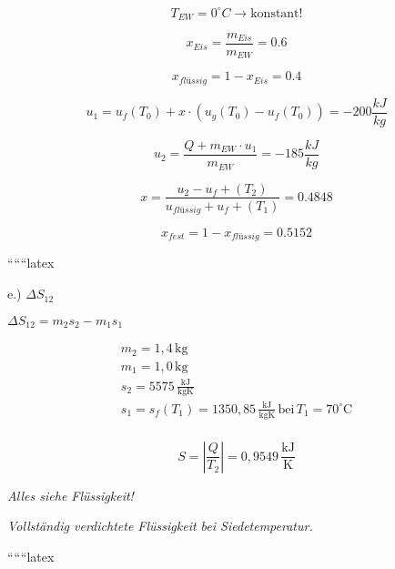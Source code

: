 \[
T_{EW} = 0^\circ C \rightarrow \text{konstant!}
\]

\[
x_{Eis} = \frac{m_{Eis}}{m_{EW}} = 0.6
\]

\[
x_{flüssig} = 1 - x_{Eis} = 0.4
\]

\[
u_1 = u_f(T_0) + x \cdot (u_g(T_0) - u_f(T_0)) = -200 \frac{kJ}{kg}
\]

\[
u_2 = \frac{Q + m_{EW} \cdot u_1}{m_{EW}} = -185 \frac{kJ}{kg}
\]

\[
x = \frac{u_2 - u_f + (T_2)}{u_{flüssig} + u_f + (T_1)} = 0.4848
\]

\[
x_{fest} = 1 - x_{flüssig} = 0.5152
\]

``````latex


e.) \(\Delta S_{12}\)

\(\Delta S_{12} = m_2 s_2 - m_1 s_1\)

\[
\begin{array}{c}
m_2 = 1,4 \, \text{kg} \\
m_1 = 1,0 \, \text{kg} \\
s_2 = 5575 \, \frac{\text{kJ}}{\text{kgK}} \\
s_1 = s_f(T_1) = 1350,85 \, \frac{\text{kJ}}{\text{kgK}} \, \text{bei} \, T_1 = 70^\circ \text{C} \\
\end{array}
\]

\[
S = \left| \frac{Q}{T_2} \right| = 0,9549 \, \frac{\text{kJ}}{\text{K}}
\]

\textit{Alles siehe Flüssigkeit!}

\textit{Vollständig verdichtete Flüssigkeit bei Siedetemperatur.}

``````latex


